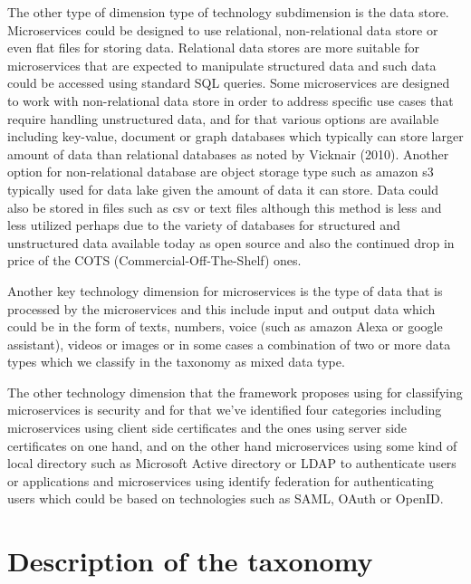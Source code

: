 \documentclass{article}
\begin{document}
\begin{itemize}
The other type of dimension type of technology subdimension is the data store. Microservices could be designed to use relational, non-relational data store or even flat files for storing data. Relational data stores are more suitable for microservices that are expected to manipulate structured data and such data could be accessed using standard SQL queries. Some microservices are designed to work with non-relational data store in order to address specific use cases that require handling unstructured data, and for that various options are available including key-value, document or graph databases which typically can store larger amount of data than relational databases as noted by Vicknair (2010). Another option for non-relational database are object storage type such as amazon s3 typically used for data lake given the amount of data it can store. Data could also be stored in files such as csv or text files although this method is less and less utilized perhaps due to the variety of databases for structured and unstructured data available today as open source and also the continued drop in price of the COTS (Commercial-Off-The-Shelf) ones.

Another key technology dimension for microservices is the type of data that is processed by the microservices and this include input and output data which could be in the form of texts, numbers, voice (such as amazon Alexa or google assistant), videos or images or in some cases a combination of two or more data types which we classify in the taxonomy as mixed data type.

The other technology dimension that the framework proposes using for classifying microservices is security and for that we’ve identified four categories including microservices using client side certificates and the ones using server side certificates on one hand, and on the other hand microservices using some kind of local directory such as Microsoft Active directory or LDAP to authenticate users or applications and microservices using identify federation for authenticating users which could be based on technologies such as SAML, OAuth or OpenID.

\end{itemize}
\section{Description of the taxonomy}
\end{document}
